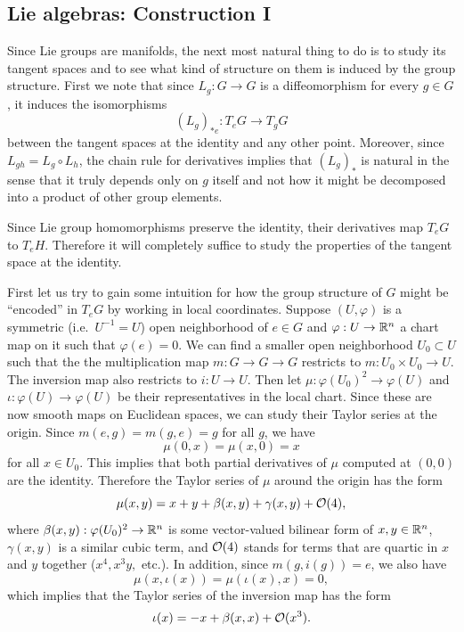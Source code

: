 \subsection{Lie algebras: Construction I}

Since Lie groups are manifolds, the next most natural thing to do is to study its tangent spaces and to see what kind of structure on them is induced by the group structure. 
First we note that since $L_g:G\to G$ is a diffeomorphism for every $g\in G$, it induces the isomorphisms
\[(L_g)_{\ast e}: T_e G\to T_g G\]
between the tangent spaces at the identity and any other point. Moreover, since $L_{gh}=L_g\circ L_h$, the chain rule for derivatives implies that $(L_g)_\ast$ is natural in the sense that it truly depends only on $g$ itself and not how it might be decomposed into a product of other group elements.

Since Lie group homomorphisms preserve the identity, their derivatives map $T_e G$ to $T_eH$. Therefore it will completely suffice to study the properties of the tangent space at the identity.


First let us try to gain some intuition for how the group structure of $G$ might be ``encoded'' in $T_e G$ by working in local coordinates. Suppose $(U,\varphi)$ is a symmetric (i.e.~$U^{-1}=U$) open neighborhood of $e\in G$ and $\varphi:U\to \mathbb{R}^n$ a chart map on it such that $\varphi(e)=0$. We can find a smaller open neighborhood $U_0\subset U$ such that the the multiplication map $m:G\to G\to G$ restricts to $m:U_0\times U_0\to U$. The inversion map also restricts to $i:U\to U$. Then let $\mu:\varphi (U_0)^2\to \varphi(U)$ and $\iota:\varphi(U)\to \varphi(U)$ be their representatives in the local chart. Since these are now smooth maps on Euclidean spaces, we can study their Taylor series at the origin. Since $m(e,g)=m(g,e)=g$ for all $g$, we have
\[\mu(0,x)=\mu(x,0)=x\]
for all $x\in U_0$. This implies that both partial derivatives of $\mu$ computed at $(0,0)$ are the identity. Therefore the Taylor series of $\mu$ around the origin has the form
\[\mu(x,y)=x+y+\beta(x,y)+\gamma(x,y)+\mathcal{O}(4),\]
where $\beta(x,y):\varphi(U_0)^2\to \mathbb{R}^n$ is some vector-valued bilinear form of $x,y\in\mathbb{R}^n$, $\gamma(x,y)$ is a similar cubic term, and $\mathcal{O}(4)$ stands for terms that are quartic in $x$ and $y$ together ($x^4, x^3 y,$ etc.). In addition, since $m(g,i(g))=e$, we also have
\[\mu(x,\iota(x))=\mu(\iota(x),x)=0,\]
which implies that the Taylor series of the inversion map has the form
\[\iota(x)=-x+\beta(x,x)+\mathcal{O}(x^3).\]

